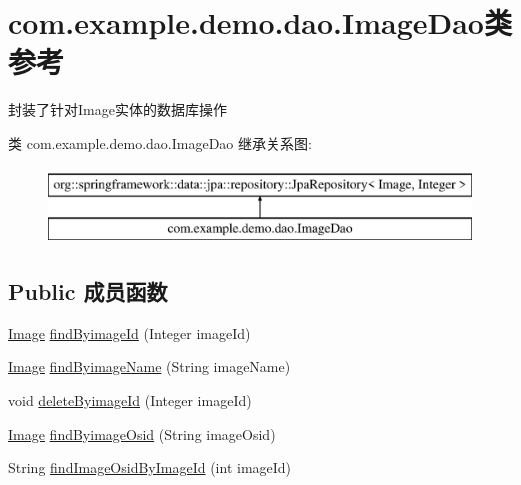 \hypertarget{interfacecom_1_1example_1_1demo_1_1dao_1_1_image_dao}{}\section{com.\+example.\+demo.\+dao.\+Image\+Dao类 参考}
\label{interfacecom_1_1example_1_1demo_1_1dao_1_1_image_dao}


封装了针对\+Image实体的数据库操作  


类 com.\+example.\+demo.\+dao.\+Image\+Dao 继承关系图\+:\begin{figure}[H]
\begin{center}
\leavevmode
\includegraphics[height=2.000000cm]{interfacecom_1_1example_1_1demo_1_1dao_1_1_image_dao}
\end{center}
\end{figure}
\subsection*{Public 成员函数}
\begin{DoxyCompactItemize}
\item 
\mbox{\hyperlink{classcom_1_1example_1_1demo_1_1modular_1_1_image}{Image}} \mbox{\hyperlink{interfacecom_1_1example_1_1demo_1_1dao_1_1_image_dao_a043e6d96369f85c355d2693d1f55ae59}{find\+Byimage\+Id}} (Integer image\+Id)
\item 
\mbox{\hyperlink{classcom_1_1example_1_1demo_1_1modular_1_1_image}{Image}} \mbox{\hyperlink{interfacecom_1_1example_1_1demo_1_1dao_1_1_image_dao_a500c4a6d4248bd640b7f7923f8c98eea}{find\+Byimage\+Name}} (String image\+Name)
\item 
void \mbox{\hyperlink{interfacecom_1_1example_1_1demo_1_1dao_1_1_image_dao_a084e0e7b4b75a68265bad1f7c2508944}{delete\+Byimage\+Id}} (Integer image\+Id)
\item 
\mbox{\hyperlink{classcom_1_1example_1_1demo_1_1modular_1_1_image}{Image}} \mbox{\hyperlink{interfacecom_1_1example_1_1demo_1_1dao_1_1_image_dao_ac4588a72e5399dbd2ba93bc19ed56ccb}{find\+Byimage\+Osid}} (String image\+Osid)
\item 
String \mbox{\hyperlink{interfacecom_1_1example_1_1demo_1_1dao_1_1_image_dao_a89a72db30ef78911c4cb22ff0d0dee98}{find\+Image\+Osid\+By\+Image\+Id}} (int image\+Id)
\end{DoxyCompactItemize}



